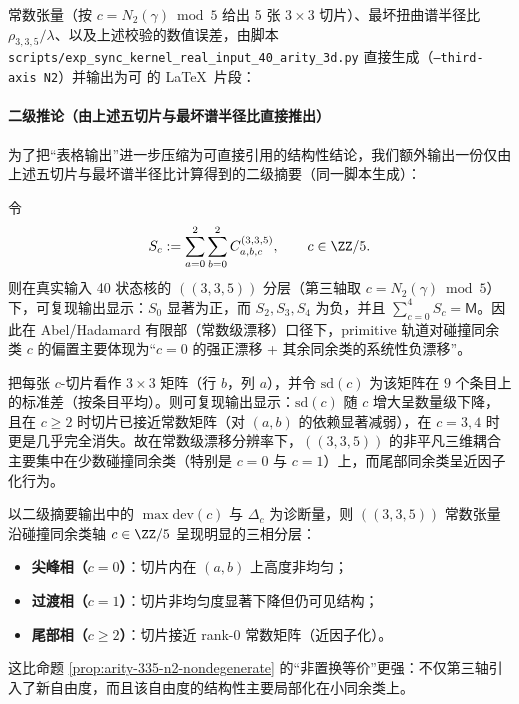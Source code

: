 常数张量（按 $c=N_2(\gamma)\bmod 5$ 给出 5 张 $3\times 3$ 切片）、最坏扭曲谱半径比 $\rho_{3,3,5}/\lambda$、以及上述校验的数值误差，由脚本
\texttt{scripts/exp\_sync\_kernel\_real\_input\_40\_arity\_3d.py}
直接生成（\texttt{--third-axis N2}）并输出为可 \verb|| 的 \LaTeX\ 片段：


\paragraph{二级推论（由上述五切片与最坏谱半径比直接推出）}
为了把“表格输出”进一步压缩为可直接引用的结构性结论，我们额外输出一份仅由上述五切片与最坏谱半径比计算得到的二级摘要（同一脚本生成）：


\begin{corollary}\label{cor:arity-335-collision-residue-drift}
令
\[
S_c:=\sum_{a=0}^{2}\sum_{b=0}^{2}C^{(3,3,5)}_{a,b,c},
\qquad c\in\ZZ/5.
\]
则在真实输入 40 状态核的 \(((3,3,5))\) 分层（第三轴取 $c=N_2(\gamma)\bmod 5$）下，可复现输出显示：$S_0$ 显著为正，而 $S_2,S_3,S_4$ 为负，并且 $\sum_{c=0}^4 S_c=\mathsf{M}$。因此在 Abel/Hadamard 有限部（常数级漂移）口径下，primitive 轨道对碰撞同余类 $c$ 的偏置主要体现为“$c=0$ 的强正漂移 + 其余同余类的系统性负漂移”。
\end{corollary}

\begin{corollary}\label{cor:arity-335-localized-ab-coupling}
把每张 $c$-切片看作 $3\times 3$ 矩阵（行 $b$，列 $a$），并令 $\mathrm{sd}(c)$ 为该矩阵在 $9$ 个条目上的标准差（按条目平均）。则可复现输出显示：$\mathrm{sd}(c)$ 随 $c$ 增大呈数量级下降，且在 $c\ge 2$ 时切片已接近常数矩阵（对 $(a,b)$ 的依赖显著减弱），在 $c=3,4$ 时更是几乎完全消失。故在常数级漂移分辨率下，\(((3,3,5))\) 的非平凡三维耦合主要集中在少数碰撞同余类（特别是 $c=0$ 与 $c=1$）上，而尾部同余类呈近因子化行为。
\end{corollary}

\begin{corollary}[三相分层：$c=0$ 的结构尖峰、$c=1$ 的过渡与 $c\ge 2$ 的近因子化尾部]\label{cor:arity-335-phase-stratification}
以二级摘要输出中的 $\max\mathrm{dev}(c)$ 与 $\Delta_c$ 为诊断量，则 \(((3,3,5))\) 常数张量沿碰撞同余类轴 $c\in\ZZ/5$ 呈现明显的三相分层：
\begin{itemize}
  \item \textbf{尖峰相（$c=0$）}：切片内在 $(a,b)$ 上高度非均匀；
  \item \textbf{过渡相（$c=1$）}：切片非均匀度显著下降但仍可见结构；
  \item \textbf{尾部相（$c\ge 2$）}：切片接近 rank-$0$ 常数矩阵（近因子化）。
\end{itemize}
这比命题 \ref{prop:arity-335-n2-nondegenerate} 的“非置换等价”更强：不仅第三轴引入了新自由度，而且该自由度的结构性主要局部化在小同余类上。
\end{corollary}

